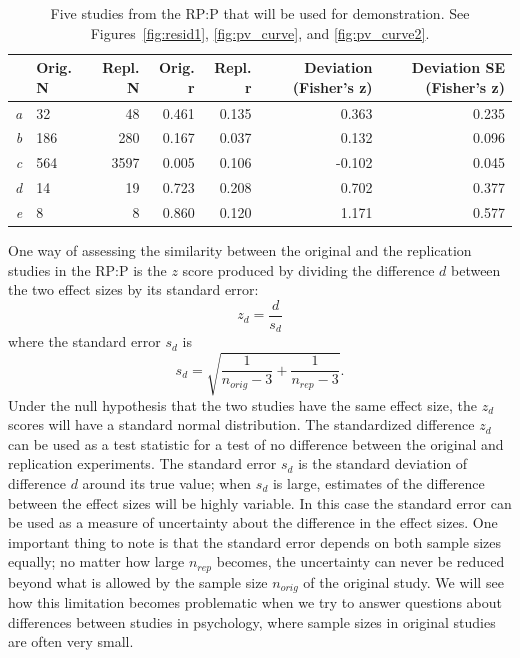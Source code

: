 \documentclass[doc,a4paper,floatsintext,draftfirst]{apa6}
\begin{document}
\begin{table}[ht]
\centering
\begin{tabular}{rlrrrrr}
  \hline
 & Orig. N & Repl. N & Orig. r & Repl. r & Deviation (Fisher's z) & Deviation SE (Fisher's z) \\ 
  \hline
{\em a} & 32 &   48 & 0.461 & 0.135 & 0.363 & 0.235 \\ 
 {\em b} & 186 &  280 & 0.167 & 0.037 & 0.132 & 0.096 \\ 
 {\em c} & 564 & 3597 & 0.005 & 0.106 & -0.102 & 0.045 \\ 
 {\em d} & 14 &   19 & 0.723 & 0.208 & 0.702 & 0.377 \\ 
 {\em e} & 8 &    8 & 0.860 & 0.120 & 1.171 & 0.577 \\ 
   \hline
\end{tabular}
\caption{Five studies from the RP:P that will be used for demonstration. See Figures~\ref{fig:resid1}, \ref{fig:pv_curve}, and \ref{fig:pv_curve2}.} 
\label{tab:studies}
\end{table}

One way of assessing the similarity between the original and the replication studies in the RP:P is the $z$ score produced by dividing the difference $d$ between the two effect sizes by its standard error:
\[
z_d = \frac{d}{s_d}
\]
where the standard error $s_d$ is
\[
s_d = \sqrt{\frac{1}{n_{orig}-3} + \frac{1}{n_{rep}-3}}.
\]
Under the null hypothesis that the two studies have the same effect size, the $z_d$ scores will have a standard normal distribution. The standardized difference $z_d$ can be used as a test statistic for a test of no difference between the original and replication experiments. The standard error $s_d$ is the standard deviation of difference $d$ around its true value; when $s_d$ is large, estimates of the difference between the effect sizes will be highly variable. In this case the standard error can be used as a measure of uncertainty about the difference in the effect sizes. One important thing to note is that the standard error depends on both sample sizes equally; no matter how large $n_{rep}$ becomes, the uncertainty can never be reduced beyond what is allowed by the sample size $n_{orig}$ of the original study. We will see how this limitation becomes problematic when we try to answer questions about differences between studies in psychology, where sample sizes in original studies are often very small.
\end{document}
